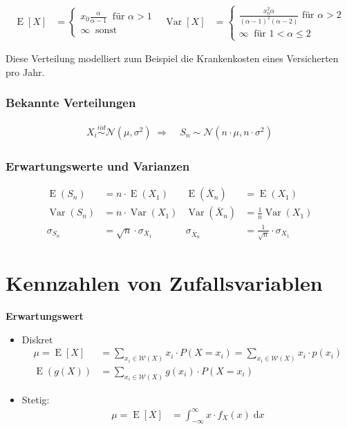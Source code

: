 \documentclass[25pt]{sciposter}
\newcommand{\Var}{\operatorname{Var}}
\newcommand{\E}{\operatorname{E}}
\newcommand{\mc}{\mathcal}
\newcommand{\rmd}{\mathrm{d}}
\newenvironment{method}[1]{\begin{mdframed}[backgroundcolor=blue!10,innertopmargin=15pt, innerbottommargin=15pt,nobreak=true]
		\textbf{#1 }
	}
	{ 
	\end{mdframed}
}
\begin{document}
\begin{multicols}{3}
\begin{align*}
\E[X] &= \begin{cases}
x_0 \frac{\alpha}{\alpha - 1}\ \text{ für } \alpha > 1 \\
\infty \ \text{ sonst}
\end{cases}
& 
\Var[X] &= \begin{cases}
\frac{x_0 ^2 \alpha}{(\alpha-1)^2(\alpha-2)} \text{ für } \alpha > 2\\
\infty \ \text{ für } 1 < \alpha \leq 2
\end{cases}
\end{align*}

Diese Verteilung modelliert zum Beispiel die Krankenkosten eines Versicherten pro Jahr.


\subsubsection*{Bekannte Verteilungen}
\begin{align*}
X_i \overset{iid}{\sim} \mc N(\mu, \sigma^2) \; \Rightarrow & \; S_n \sim \mc N(n \cdot \mu, n \cdot \sigma^2)
\end{align*}
\subsubsection*{Erwartungswerte und Varianzen}
\begin{align*}
\E(S_n) &= n \cdot \E(X_1) & \E(\overline{X}_n) &= \E(X_1) \\
\Var(S_n) &= n \cdot \Var(X_1) & \Var(\overline{X}_n) &= \tfrac{1}{n} \Var(X_1) \\
\sigma_{S_n} &= \sqrt{n} \cdot \sigma_{X_1} & \sigma_{\overline{X}_n} &= \tfrac{1}{\sqrt{n}} \cdot \sigma_{X_1}
\end{align*}



\section{Kennzahlen von Zufallsvariablen}


\begin{method}{Erwartungswert}
	\begin{itemize}
		\item Diskret
		\begin{align*}
	\mu = \E[X] &= \sum_{x_i \in \mathcal{W}(X)} x_i \cdot P(X=x_i) = \sum_{x_i \in \mathcal{W}(X)} x_i \cdot p(x_i) \\
	\E(g(X)) &= \sum_{x_i \in \mathcal{W}(X)} g(x_i) \cdot P(X=x_i)
	\end{align*}
		\item Stetig:
\begin{align*}
\mu = \E[X] &= \int_{-\infty}^{\infty} x \cdot f_X(x) \; \rmd x
\end{align*}
		

\end{itemize}
\end{method}
\end{multicols}
\end{document}
